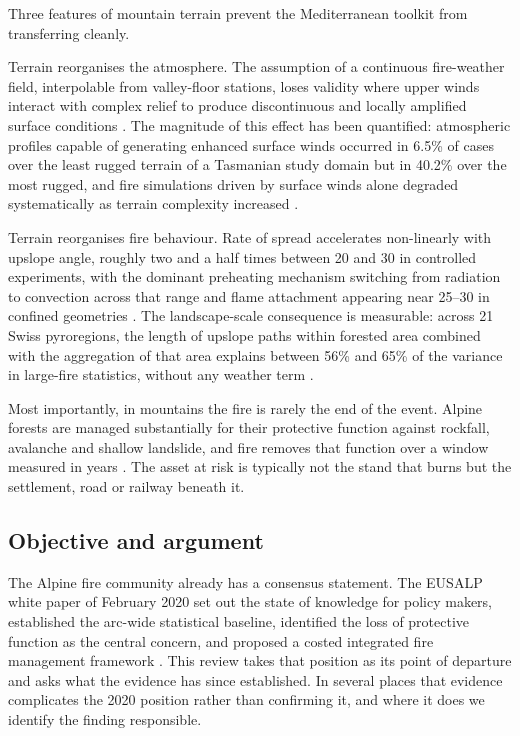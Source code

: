 \documentclass[11pt,a4paper]{article}
\begin{document}
Three features of mountain terrain prevent the Mediterranean toolkit from transferring cleanly.

Terrain reorganises the atmosphere. The assumption of a continuous fire-weather field, interpolable from valley-floor stations, loses validity where upper winds interact with complex relief to produce discontinuous and locally amplified surface conditions \citep{sharples_overview_2009}. The magnitude of this effect has been quantified: atmospheric profiles capable of generating enhanced surface winds occurred in 6.5\% of cases over the least rugged terrain of a Tasmanian study domain but in 40.2\% over the most rugged, and fire simulations driven by surface winds alone degraded systematically as terrain complexity increased \citep{ozaki_impact_2022}.

Terrain reorganises fire behaviour. Rate of spread accelerates non-linearly with upslope angle, roughly two and a half times between 20\degree{} and 30\degree{} in controlled experiments, with the dominant preheating mechanism switching from radiation to convection across that range and flame attachment appearing near 25--30\degree{} in confined geometries \citep{hayajneh_wind_2026}. The landscape-scale consequence is measurable: across 21 Swiss pyroregions, the length of upslope paths within forested area combined with the aggregation of that area explains between 56\% and 65\% of the variance in large-fire statistics, without any weather term \citep{conedera_linking_2024}.

Most importantly, in mountains the fire is rarely the end of the event. Alpine forests are managed substantially for their protective function against rockfall, avalanche and shallow landslide, and fire removes that function over a window measured in years \citep{melzner_wildfire-induced_2025, melzner_brief_2019}. The asset at risk is typically not the stand that burns but the settlement, road or railway beneath it.

\subsection{Objective and argument}

The Alpine fire community already has a consensus statement. The EUSALP white paper of February 2020 set out the state of knowledge for policy makers, established the arc-wide statistical baseline, identified the loss of protective function as the central concern, and proposed a costed integrated fire management framework \citep{muller_forest_2020}. This review takes that position as its point of departure and asks what the evidence has since established. In several places that evidence complicates the 2020 position rather than confirming it, and where it does we identify the finding responsible.
\end{document}
